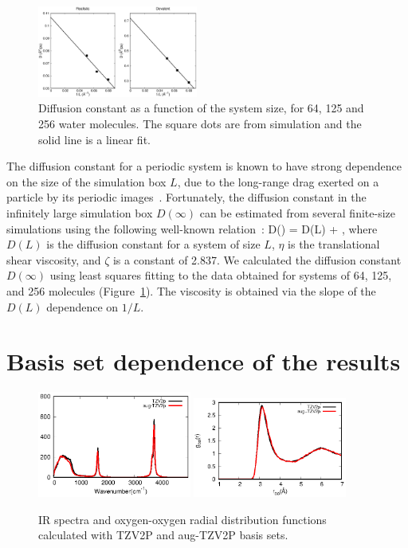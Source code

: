 \documentclass[aps,prl,reprint,amsmath,amssymb]{revtex4-1}
\begin{document}
\begin{figure}[t]
\includegraphics[width=0.47\textwidth]{msd}
\caption{Diffusion constant as a function of the system size, for 64, 125 and 256 water molecules. 
The square dots are from simulation and the solid line is a linear fit.}\label{Fig:dfs}
\end{figure} 

The diffusion constant for a periodic system is known to have strong dependence on the size of the simulation box $L$, due to the long-range drag exerted on a particle by its periodic images~\cite{dunweg1993molecular}. 
Fortunately, the diffusion constant in the infinitely large simulation box $D(\infty)$ can be estimated from several finite-size simulations using the following well-known relation~\cite{dunweg1993molecular}:
%
\bea
D(\infty) = D(L) + ,
\eea
%
where $D(L)$ is the diffusion constant for a system of size $L$, $\eta$ is the translational shear viscosity, and $\zeta$ is a constant of 2.837. 
We calculated the diffusion constant $D(\infty)$ using least squares fitting to the data obtained for systems of 64, 125, and 256 molecules (Figure~\ref{Fig:dfs}). The viscosity is obtained via the slope of the $D(L)$ dependence on $1/L$.

\section{Basis set dependence of the results} 

\begin{figure}
\includegraphics[width=0.45\textwidth]{basis_ir}
\includegraphics[width=0.45\textwidth]{basis_rdf}
\caption{IR spectra and oxygen-oxygen radial distribution functions calculated with TZV2P and aug-TZV2P basis sets.}\label{Fig:basis}
\end{figure} 
\end{document}
